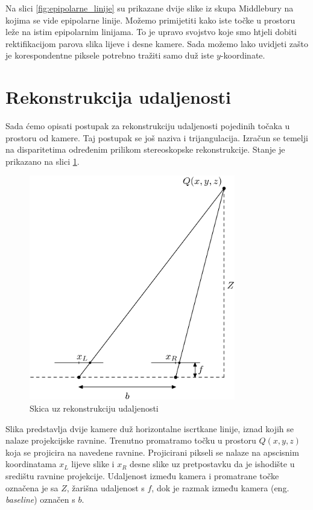 \documentclass[utf8, zavrsni, numeric]{fer}
\begin{document}
Na slici \ref{fig:epipolarne_linije} su prikazane dvije slike iz skupa Middlebury na kojima
se vide epipolarne linije. Možemo primijetiti kako iste točke u prostoru leže na istim epipolarnim
linijama. To je upravo svojstvo koje smo htjeli dobiti rektifikacijom parova slika lijeve i desne kamere.
Sada možemo lako uvidjeti zašto je korespondentne piksele potrebno tražiti samo duž iste $y$-koordinate.

\section{Rekonstrukcija udaljenosti}
Sada ćemo opisati postupak za rekonstrukciju udaljenosti pojedinih točaka u prostoru od kamere. Taj postupak se još naziva i trijangulacija. Izračun se temelji na disparitetima određenim prilikom stereoskopske rekonstrukcije.
Stanje je prikazano na slici \ref{fig:rekonstrukcija_udaljenosti}.

\begin{figure}[htb]
  \centering
  \includegraphics[width=9cm]{img/rekonstrukcija_udaljenosti.png}
  \caption{Skica uz rekonstrukciju udaljenosti}
  \label{fig:rekonstrukcija_udaljenosti}
\end{figure}

Slika predstavlja dvije kamere duž horizontalne iscrtkane linije, iznad kojih se
nalaze projekcijske ravnine. Trenutno promatramo točku u prostoru $Q(x, y, z)$ koja se projicira na navedene ravnine.
Projicirani pikseli se nalaze na apscisnim koordinatama $x_L$ lijeve slike i
$x_R$ desne slike uz pretpostavku da je ishodište u središtu ravnine projekcije. Udaljenost između kamera i promatrane točke označena je sa $Z$, žarišna
udaljenost s $f$, dok je razmak između kamera (eng. {\sl baseline}) označen s $b$.
\end{document}

